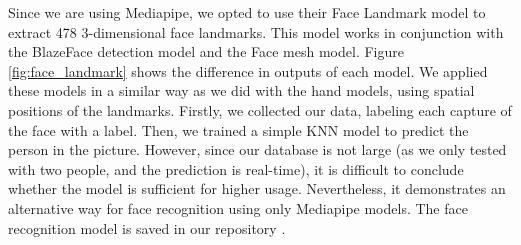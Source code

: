 Since we are using Mediapipe, we opted to use their Face Landmark model to extract 478 3-dimensional face landmarks. This model works in conjunction with the BlazeFace detection model and the Face mesh model. Figure \ref{fig:face_landmark} shows the difference in outputs of each model. We applied these models in a similar way as we did with the hand models, using spatial positions of the landmarks. Firstly, we collected our data, labeling each capture of the face with a label. Then, we trained a simple KNN model to predict the person in the picture. However, since our database is not large (as we only tested with two people, and the prediction is real-time), it is difficult to conclude whether the model is sufficient for higher usage. Nevertheless, it demonstrates an alternative way for face recognition using only Mediapipe models. The face recognition model is saved in our repository \cite{touchlessdronecontrol}.


